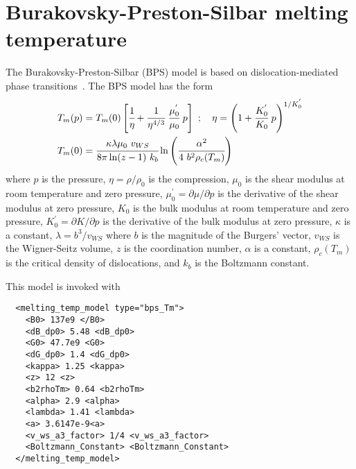 \section{Burakovsky-Preston-Silbar melting temperature}
The Burakovsky-Preston-Silbar (BPS) model is based on dislocation-mediated
phase transitions~\cite{Burakovsky2000}.  The BPS model has the form
\begin{align}
  T_m(p) & = T_m(0)
    \left[\cfrac{1}{\eta} + 
          \cfrac{1}{\eta^{4/3}}~\cfrac{\mu_0^{'}}{\mu_0}~p\right]~; 
  \quad
  \eta = \left(1 + \cfrac{K_0^{'}}{K_0}~p\right)^{1/K_0^{'}} 
  \label{eq:TmBPS}\\
  T_m(0) & = \cfrac{\kappa\lambda\mu_0~v_{WS}}{8\pi\ln(z-1)~k_b}
             \ln\left(\cfrac{\alpha^2}{4~b^2\rho_c(T_m)}\right)
\end{align}
where $p$ is the pressure, $\eta = \rho/\rho_0$ is the compression, 
$\mu_0$ is the shear modulus at room temperature and zero pressure, 
$\mu_0^{'} = \partial\mu/\partial p$ is the derivative of the shear modulus 
at zero pressure, $K_0$ is the bulk modulus at room temperature and
zero pressure, $K_0^{'} = \partial K/\partial p$ is the derivative of the 
bulk modulus at zero pressure, $\kappa$ is a constant, $\lambda = b^3/v_{WS}$
where $b$ is the magnitude of the Burgers' vector, $v_{WS}$ is the 
Wigner-Seitz volume, $z$ is the coordination number, $\alpha$ is a 
constant, $\rho_c(T_m)$ is the critical density of dislocations, and
$k_b$ is the Boltzmann constant.

This model is invoked with
\lstset{language=XML}
\begin{lstlisting}
  <melting_temp_model type="bps_Tm">
    <B0> 137e9 </B0>
    <dB_dp0> 5.48 <dB_dp0>
    <G0> 47.7e9 <G0>
    <dG_dp0> 1.4 <dG_dp0>
    <kappa> 1.25 <kappa>
    <z> 12 <z>
    <b2rhoTm> 0.64 <b2rhoTm>
    <alpha> 2.9 <alpha>
    <lambda> 1.41 <lambda>
    <a> 3.6147e-9<a>
    <v_ws_a3_factor> 1/4 <v_ws_a3_factor>
    <Boltzmann_Constant> <Boltzmann_Constant>
  </melting_temp_model>
\end{lstlisting}

